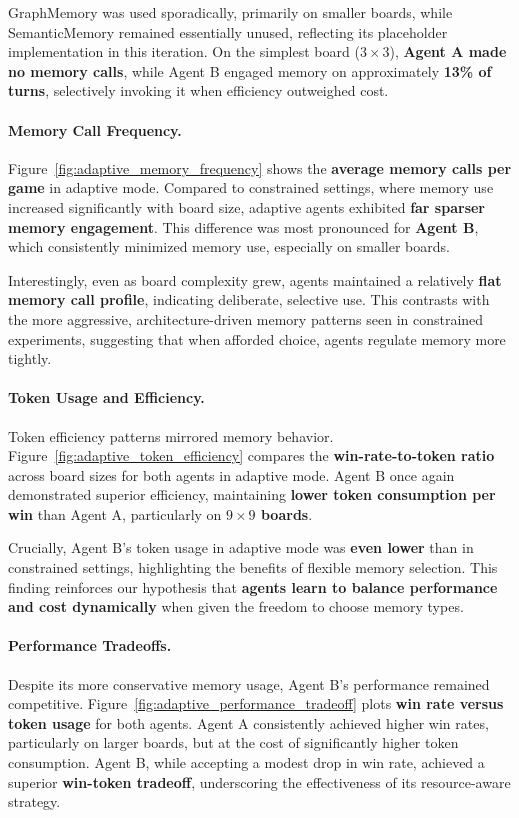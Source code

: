 \documentclass[10pt]{article}
\begin{document}
GraphMemory was used sporadically, primarily on smaller boards, while SemanticMemory remained essentially unused, reflecting its placeholder implementation in this iteration. On the simplest board ($3\times3$), \textbf{Agent A made no memory calls}, while Agent B engaged memory on approximately \textbf{13\% of turns}, selectively invoking it when efficiency outweighed cost.

\paragraph{Memory Call Frequency.}  
Figure~\ref{fig:adaptive_memory_frequency} shows the \textbf{average memory calls per game} in adaptive mode. Compared to constrained settings, where memory use increased significantly with board size, adaptive agents exhibited \textbf{far sparser memory engagement}. This difference was most pronounced for \textbf{Agent B}, which consistently minimized memory use, especially on smaller boards.

Interestingly, even as board complexity grew, agents maintained a relatively \textbf{flat memory call profile}, indicating deliberate, selective use. This contrasts with the more aggressive, architecture-driven memory patterns seen in constrained experiments, suggesting that when afforded choice, agents regulate memory more tightly.

\paragraph{Token Usage and Efficiency.}  
Token efficiency patterns mirrored memory behavior. Figure~\ref{fig:adaptive_token_efficiency} compares the \textbf{win-rate-to-token ratio} across board sizes for both agents in adaptive mode. Agent B once again demonstrated superior efficiency, maintaining \textbf{lower token consumption per win} than Agent A, particularly on \textbf{$9\times9$ boards}.

Crucially, Agent B's token usage in adaptive mode was \textbf{even lower} than in constrained settings, highlighting the benefits of flexible memory selection. This finding reinforces our hypothesis that \textbf{agents learn to balance performance and cost dynamically} when given the freedom to choose memory types.

\paragraph{Performance Tradeoffs.}  
Despite its more conservative memory usage, Agent B's performance remained competitive. Figure~\ref{fig:adaptive_performance_tradeoff} plots \textbf{win rate versus token usage} for both agents. Agent A consistently achieved higher win rates, particularly on larger boards, but at the cost of significantly higher token consumption. Agent B, while accepting a modest drop in win rate, achieved a superior \textbf{win-token tradeoff}, underscoring the effectiveness of its resource-aware strategy.
\end{document}
